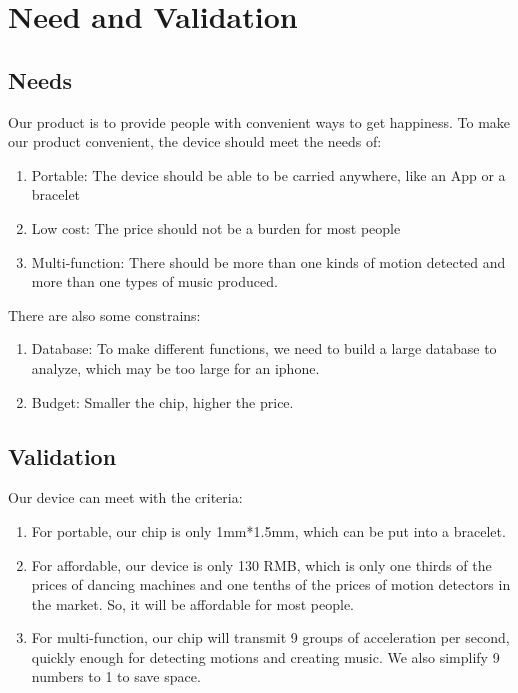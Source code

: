 \section{Need and Validation}
\subsection{Needs}
\hspace*{2em}Our product is to provide people with convenient ways to get happiness.
\hspace*{2em}To make our product convenient, the device should meet the needs of:
\begin{enumerate}[\hspace*{3em}(1)]
\item Portable: The device should be able to be carried anywhere, like an App or a bracelet
\item Low cost: The price should not be a burden for most people
\item Multi-function: There should be more than one kinds of motion detected and more than one types of music produced.
\end{enumerate}
\hspace*{2em}There are also some constrains:
\begin{enumerate}[\hspace*{3em}(1)]
\item Database: To make different functions, we need to build a large database to analyze, which may be too large for an iphone.
\item Budget: Smaller the chip, higher the price.
\end{enumerate}
\subsection{Validation}
\hspace*{2em}Our device can meet with the criteria:
\begin{enumerate}[\hspace*{3em}(1)]
\item For portable, our chip is only 1mm*1.5mm, which can be put into a bracelet.
\item For affordable, our device is only 130 RMB, which is only one thirds of the prices of dancing machines and one tenths of the prices of motion detectors in the market.  So, it will be affordable for most people. 
\item For multi-function, our chip will transmit 9 groups of acceleration per second, quickly enough for detecting motions and creating music. We also simplify 9 numbers to 1 to save space.
\end{enumerate}